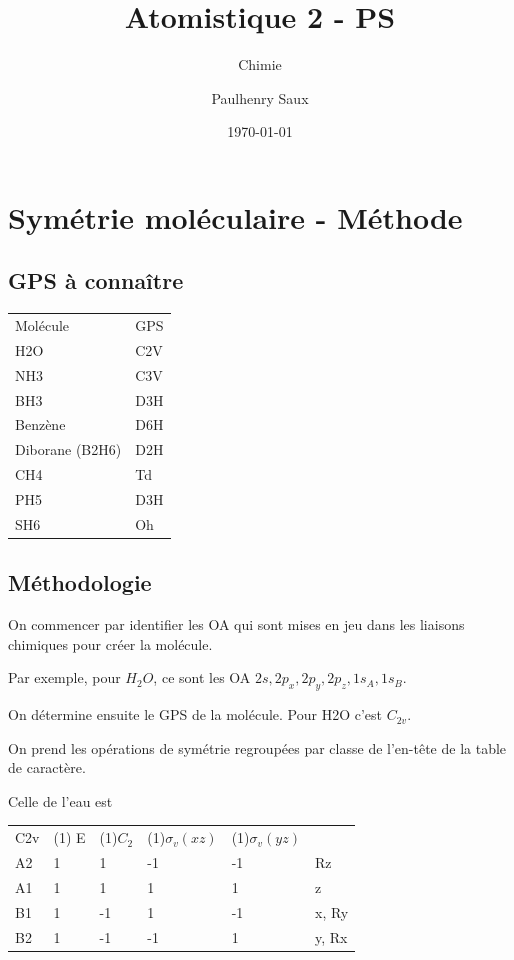 \documentclass[french]{yLectureNote}
\title{Atomistique 2 - PS}
\subtitle{Chimie}
\author{Paulhenry Saux}
\date{\today}
\begin{document}
\setcounter{chapter}{3}
\chapter{Symétrie moléculaire - Méthode}
\section{GPS à connaître}
\begin{center}
\begin{tabular}{ll}
Molécule & GPS\\
H2O & C2V\\
NH3 & C3V\\
BH3 & D3H\\
Benzène & D6H\\
Diborane (B2H6) & D2H\\
CH4 & Td\\
PH5 & D3H\\
SH6 & Oh
          \end{tabular}
          \end{center}

\section{Méthodologie}
On commencer par identifier les OA qui sont mises en jeu dans les liaisons chimiques pour créer la molécule.

Par exemple, pour \(H_2O\), ce sont les OA \(2s,2p_x,2p_y,2p_z, 1s_A,1s_B\).

On détermine ensuite le GPS de la molécule. Pour H2O c'est \(C_{2v}\).

On prend les opérations de symétrie regroupées par classe de l'en-t\^ete de la table de caractère.

Celle de l'eau est \begin{center}
\begin{tabular}{llllll}
C2v & ({\color{criticalColor}1}) E & ({\color{green}1})\(C_2\) & (1)\(\sigma_{v}(xz)\) & (1)\(\sigma_{v}(yz)\) \\
A2 & 1 & 1 & -1 & -1 & Rz\\
A1 & {\color{warningColor}1} & {\color{tipsColor}1} & 1 & 1 & z\\
B1 & 1 & -1 & 1 & -1 & x, Ry\\
B2 & 1 & -1 & -1 & 1 & y, Rx
                   \end{tabular}
                   \end{center}
\end{document}
